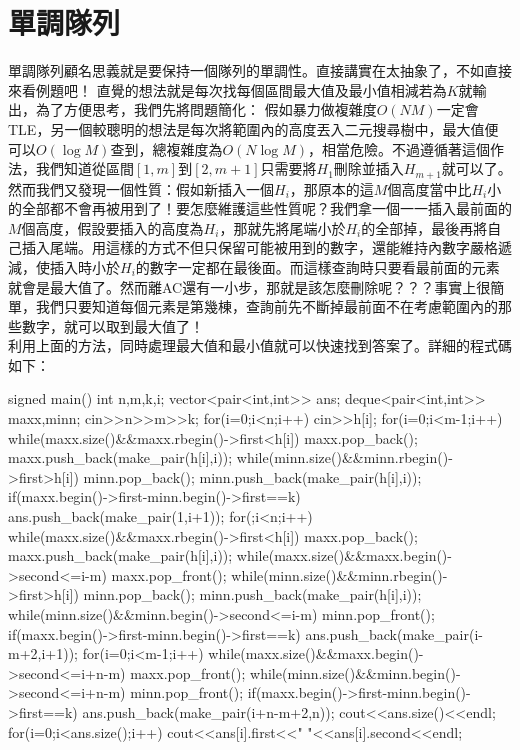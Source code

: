 \documentclass[main.tex]{subfiles}
\begin{document}
\section{單調隊列}
單調隊列顧名思義就是要保持一個隊列的單調性。直接講實在太抽象了，不如直接來看例題吧！
直覺的想法就是每次找每個區間最大值及最小值相減若為$K$就輸出，為了方便思考，我們先將問題簡化：
假如暴力做複雜度$O(NM)$一定會TLE，另一個較聰明的想法是每次將範圍內的高度丟入二元搜尋樹中，最大值便可以$O(\log M)$查到，總複雜度為$O(N\log M)$，相當危險。不過遵循著這個作法，我們知道從區間$[1,m]$到$[2,m+1]$只需要將$H_1$刪除並插入$H_{m+1}$就可以了。\\
	然而我們又發現一個性質：假如新插入一個$H_i$，那原本的這$M$個高度當中比$H_i$小的全部都不會再被用到了！要怎麼維護這些性質呢？我們拿一個一一插入最前面的$M$個高度，假設要插入的高度為$H_i$，那就先將尾端小於$H_i$的全部掉，最後再將自己插入尾端。用這樣的方式不但只保留可能被用到的數字，還能維持內數字嚴格遞減，使插入時小於$H_i$的數字一定都在最後面。而這樣查詢時只要看最前面的元素就會是最大值了。然而離AC還有一小步，那就是該怎麼刪除呢？？？事實上很簡單，我們只要知道每個元素是第幾棟，查詢前先不斷掉最前面不在考慮範圍內的那些數字，就可以取到最大值了！\\
利用上面的方法，同時處理最大值和最小值就可以快速找到答案了。詳細的程式碼如下：
\begin{C++}
signed main() {
  int n,m,k,i;
  vector<pair<int,int>> ans;
  deque<pair<int,int>> maxx,minn;
  cin>>n>>m>>k;
  for(i=0;i<n;i++)
    cin>>h[i];
  for(i=0;i<m-1;i++){
    while(maxx.size()&&maxx.rbegin()->first<h[i])
      maxx.pop_back();
    maxx.push_back(make_pair(h[i],i));
    while(minn.size()&&minn.rbegin()->first>h[i])
      minn.pop_back();
    minn.push_back(make_pair(h[i],i));
    if(maxx.begin()->first-minn.begin()->first==k)
      ans.push_back(make_pair(1,i+1));
  }
  for(;i<n;i++){
    while(maxx.size()&&maxx.rbegin()->first<h[i])
      maxx.pop_back();
    maxx.push_back(make_pair(h[i],i));
    while(maxx.size()&&maxx.begin()->second<=i-m)
      maxx.pop_front();
    while(minn.size()&&minn.rbegin()->first>h[i])
      minn.pop_back();
    minn.push_back(make_pair(h[i],i));
    while(minn.size()&&minn.begin()->second<=i-m)
      minn.pop_front();
    if(maxx.begin()->first-minn.begin()->first==k)
      ans.push_back(make_pair(i-m+2,i+1));
  }
  for(i=0;i<m-1;i++){
    while(maxx.size()&&maxx.begin()->second<=i+n-m)
      maxx.pop_front();
    while(minn.size()&&minn.begin()->second<=i+n-m)
      minn.pop_front();
    if(maxx.begin()->first-minn.begin()->first==k)
      ans.push_back(make_pair(i+n-m+2,n));
  }
  cout<<ans.size()<<endl;
  for(i=0;i<ans.size();i++)
    cout<<ans[i].first<<" "<<ans[i].second<<endl;
}
\end{C++}
\end{document}
